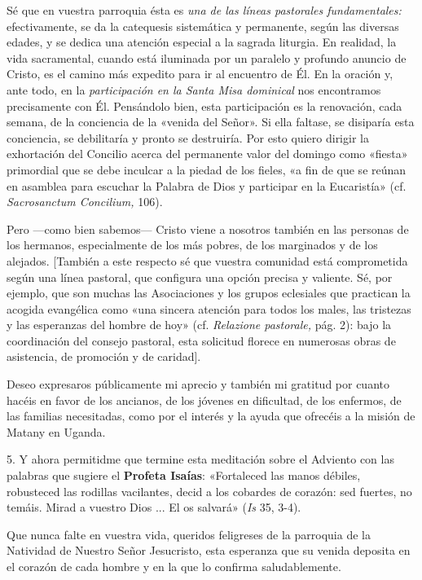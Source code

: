 Sé que en vuestra parroquia ésta es \emph{una de las líneas pastorales
	fundamentales:} efectivamente, se da la catequesis sistemática y
permanente, según las diversas edades, y se dedica una atención especial
a la sagrada liturgia. En realidad, la vida sacramental, cuando está
iluminada por un paralelo y profundo anuncio de Cristo, es el camino más
expedito para ir al encuentro de Él. En la oración y, ante todo, en la
\emph{participación en la Santa Misa dominical} nos encontramos
precisamente con Él. Pensándolo bien, esta participación es la
renovación, cada semana, de la conciencia de la «venida del Señor». Si
ella faltase, se disiparía esta conciencia, se debilitaría y pronto se
destruiría. Por esto quiero dirigir la exhortación del Concilio acerca
del permanente valor del domingo como «fiesta» primordial que se debe
inculcar a la piedad de los fieles, «a fin de que se reúnan en asamblea
para escuchar la Palabra de Dios y participar en la Eucaristía» (cf.
\emph{Sacrosanctum Concilium,} 106).

Pero ---como bien sabemos--- Cristo viene a nosotros también en las
personas de los hermanos, especialmente de los más pobres, de los
marginados y de los alejados. {[}También a este respecto sé que vuestra
comunidad está comprometida según una línea pastoral, que configura una
opción precisa y valiente. Sé, por ejemplo, que son muchas las
Asociaciones y los grupos eclesiales que practican la acogida evangélica
como «una sincera atención para todos los males, las tristezas y las
esperanzas del hombre de hoy» (cf. \emph{Relazione pastorale,} pág. 2):
bajo la coordinación del consejo pastoral, esta solicitud florece en
numerosas obras de asistencia, de promoción y de caridad{]}.

Deseo expresaros públicamente mi aprecio y también mi gratitud por
cuanto hacéis en favor de los ancianos, de los jóvenes en dificultad, de
los enfermos, de las familias necesitadas, como por el interés y la
ayuda que ofrecéis a la misión de Matany en Uganda.

5. Y ahora permitidme que termine esta meditación sobre el Adviento con
las palabras que sugiere el \textbf{Profeta Isaías}: «Fortaleced las
manos débiles, robusteced las rodillas vacilantes, decid a los cobardes
de corazón: sed fuertes, no temáis. Mirad a vuestro Dios ... El os
salvará» (\emph{Is} 35, 3-4).

Que nunca falte en vuestra vida, queridos feligreses de la parroquia de
la Natividad de Nuestro Señor Jesucristo, esta esperanza que su venida
deposita en el corazón de cada hombre y en la que lo confirma
saludablemente.



